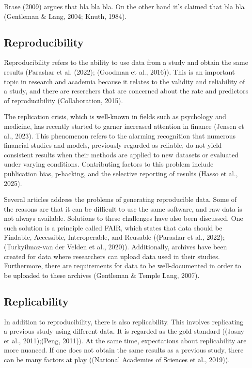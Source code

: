 \documentclass[
  a4paper,
]{article}
\begin{document}
Brase (2009) argues that bla bla bla. On the other hand it's claimed
that bla bla (Gentleman \& Lang, 2004; Knuth, 1984).

\subsection{Reproducibility}\label{reproducibility}

Reproducibility refers to the ability to use data from a study and
obtain the same results (Parashar et al. (2022); (Goodman et al.,
2016)). This is an important topic in research and academia because it
relates to the validity and reliability of a study, and there are
reserchers that are concerned about the rate and predictors of
reproducibility (Collaboration, 2015).

The replication crisis, which is well-known in fields such as psychology
and medicine, has recently started to garner increased attention in
finance (Jensen et al., 2023). This phenomenon refers to the alarming
recognition that numerous financial studies and models, previously
regarded as reliable, do not yield consistent results when their methods
are applied to new datasets or evaluated under varying conditions.
Contributing factors to this problem include publication bias,
p-hacking, and the selective reporting of results (Hasso et al., 2025).

Several articles address the problems of generating reproducible data.
Some of the reasons are that it can be difficult to use the same
software, and raw data is not always available. Solutions to these
challenges have also been discussed. One such solution is a principle
called FAIR, which states that data should be Findable, Accessible,
Interoperable, and Reusable ((Parashar et al., 2022);(Turkyilmaz-van der
Velden et al., 2020)). Additionally, archives have been created for data
where researchers can upload data used in their studies. Furthermore,
there are requirements for data to be well-documented in order to be
uploaded to these archives (Gentleman \& Temple Lang, 2007).

\subsection{Replicability}\label{replicability}

In addition to reproducibility, there is also replicability. This
involves replicating a previous study using different data. It is
regarded as the gold standard ((Jasny et al., 2011);(Peng, 2011)). At
the same time, expectations about replicability are more nuanced. If one
does not obtain the same results as a previous study, there can be many
factors at play ((National Academies of Sciences et al., 2019)).
\end{document}
